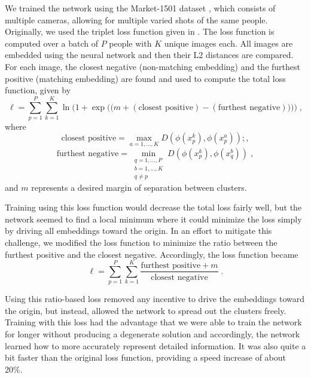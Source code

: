 We trained the network using the Market-1501 dataset \cite{Market1501}, which consists of multiple cameras, allowing for multiple varied shots of the same people. Originally, we used the triplet loss function given in \cite{Wang2018}. The loss function is computed over a batch of $P$ people with $K$ unique images each. All images are embedded using the neural network and then their L2 distances are compared. For each image, the closest negative (non-matching embedding) and the furthest positive (matching embedding) are found and used to compute the total loss function, given by
\begin{equation}
    \ell = \sum_{p=1}^P \sum_{k=1}^K
            \ln \Bigg(1 + \exp\bigg(\big(
                m + (\text{closest positive})
                  - (\text{furthest negative})
            \big)\bigg)\Bigg)\;,
\end{equation}
where
\begin{equation}
    \text{closest positive} = \max_{a=1,\dots,K}D\left( \phi(x_p^k), \phi(x_p^a)\right);,
\end{equation}
\begin{equation}
    \text{furthest negative} = \min_{\substack{q=1,\dots,P \\ b=1,\dots,K \\ q\neq p}}
                                D\left( \phi(x_p^k), \phi(x_q^b)\right)\;,
\end{equation}
and $m$ represents a desired margin of separation between clusters.

Training using this loss function would decrease the total loss fairly well, but the network seemed to find a local minimum where it could minimize the loss simply by driving all embeddings toward the origin. In an effort to mitigate this challenge, we modified the loss function to minimize the ratio between the furthest positive and the closest negative. Accordingly, the loss function became
\begin{equation}
\label{eq:ratio_loss1}
    \ell = \sum_{p=1}^P \sum_{k=1}^K
            \frac{\text{furthest positive} + m}{\text{closest negative}} \;.
\end{equation}

Using this ratio-based loss removed any incentive to drive the embeddings toward the origin, but instead, allowed the network to spread out the clusters freely. Training with this loss had the advantage that we were able to train the network for longer without producing a degenerate solution and accordingly, the network learned how to more accurately represent detailed information. It was also quite a bit faster than the original loss function, providing a speed increase of about 20\%.

